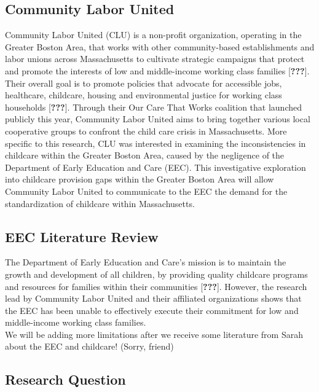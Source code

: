 \documentclass[10pt,letterpaper]{article}
\begin{document}
\subsection{Community Labor United}\label{community-labor-united}

Community Labor United (CLU) is a non-profit organization, operating in
the Greater Boston Area, that works with other community-based
establishments and labor unions across Massachusetts to cultivate
strategic campaigns that protect and promote the interests of low and
middle-income working class families {[}{\textbf{???}}{]}. Their overall
goal is to promote policies that advocate for accessible jobs,
healthcare, childcare, housing and environmental justice for working
class households {[}{\textbf{???}}{]}. Through their Our Care That Works
coalition that launched publicly this year, Community Labor United aims
to bring together various local cooperative groups to confront the child
care crisis in Massachusetts. More specific to this research, CLU was
interested in examining the inconsistencies in childcare within the
Greater Boston Area, caused by the negligence of the Department of Early
Education and Care (EEC). This investigative exploration into childcare
provision gaps within the Greater Boston Area will allow Community Labor
United to communicate to the EEC the demand for the standardization of
childcare within Massachusetts.

\subsection{EEC Literature Review}\label{eec-literature-review}

The Department of Early Education and Care's mission is to maintain the
growth and development of all children, by providing quality childcare
programs and resources for families within their communities
{[}{\textbf{???}}{]}. However, the research lead by Community Labor
United and their affiliated organizations shows that the EEC has been
unable to effectively execute their commitment for low and middle-income
working class families.\\
We will be adding more limitations after we receive some literature from
Sarah about the EEC and childcare! (Sorry, friend)

\subsection{Research Question}\label{research-question}
\end{document}
